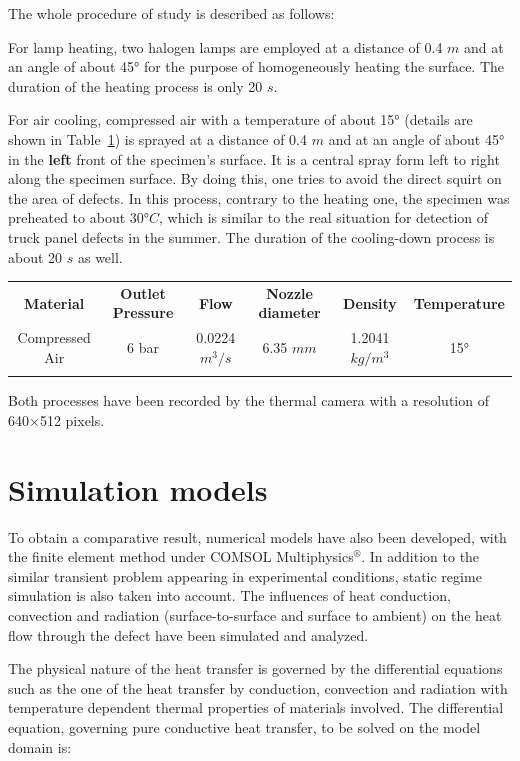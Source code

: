 \documentclass{tQRT2e}
\begin{document}
The whole procedure of study is described as follows:  

For lamp heating, two halogen lamps are employed at a distance of 0.4 $ m $ and at an angle of about 45° for the purpose of homogeneously heating the surface. The duration of the heating process is only 20 $ s $.   

For air cooling, compressed air with a temperature of about 15° (details are shown in Table~\ref{air_cool}) is sprayed at a distance of 0.4 $m$ and at an angle of about 45° in the \textbf{left} front of the specimen’s surface. It is a central spray form left to right along the specimen surface. By doing this, one tries to avoid the direct squirt on the area of defects. In this process, contrary to the heating one, the specimen was preheated to about 30$ °C $, which is similar to the real situation for detection of truck panel defects in the summer. The duration of the cooling-down process is about 20 $ s $ as well.   
 \begin{table}
 {\begin{tabular}[l]{@{}cccccc}\toprule
   \textbf{Material} & \textbf{Outlet Pressure} & \textbf{Flow}
          & \textbf{Nozzle diameter}
          & \textbf{Density} & \textbf{Temperature} \\
 \colrule
   Compressed Air & 6 bar & 0.0224 $m^3/s$ & 6.35 $mm$ & 1.2041 $kg/m^3$ & 15° \\
 \botrule
 \end{tabular}}
 \label{air_cool}
 \end{table}
Both processes have been recorded by the thermal camera with a resolution of 640$\times$512 pixels.  

\section{Simulation models}
To obtain a comparative result, numerical models have also been developed, with the finite element method under COMSOL Multiphysics$^{®}$. In addition to the similar transient problem appearing in experimental conditions, static regime simulation is also taken into account. The influences of heat conduction, convection and radiation (surface-to-surface and surface to ambient) on the heat flow through the defect have been simulated and analyzed.

The physical nature of the heat transfer is governed by the differential equations such as the one of the heat transfer by conduction, convection and radiation with temperature dependent thermal properties of materials involved. The differential equation, governing pure conductive heat transfer, to be solved on the model domain is: 
\end{document}
